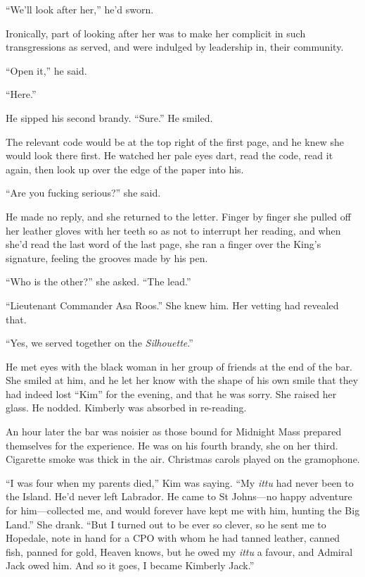 \documentclass[11pt,a5paper]{article}
\begin{document}
``We'll look after her,'' he'd sworn.

Ironically, part of looking after her was to make her complicit in such transgressions as served, and were indulged by leadership in, their community.

``Open it,'' he said.

``Here.''

He sipped his second brandy. ``Sure.'' He smiled.

The relevant code would be at the top right of the first page, and he knew she would look there first. He watched her pale eyes dart, read the code, read it again, then look up over the edge of the paper into his.

``Are you fucking serious?'' she said.

He made no reply, and she returned to the letter. Finger by finger she pulled off her leather gloves with her teeth so as not to interrupt her reading, and when she'd read the last word of the last page, she ran a finger over the King's signature, feeling the grooves made by his pen.

``Who is the other?'' she asked. ``The lead.''

``Lieutenant Commander Asa Roos.'' She knew him. Her vetting had revealed that.

``Yes, we served together on the \emph{Silhouette}.''

He met eyes with the black woman in her group of friends at the end of the bar. She smiled at him, and he let her know with the shape of his own smile that they had indeed lost ``Kim'' for the evening, and that he was sorry. She raised her glass. He nodded. Kimberly was absorbed in re-reading.

An hour later the bar was noisier as those bound for Midnight Mass prepared themselves for the experience. He was on his fourth brandy, she on her third. Cigarette smoke was thick in the air. Christmas carols played on the gramophone.

``I was four when my parents died,'' Kim was saying. ``My \emph{ittu} had never been to the Island. He'd never left Labrador. He came to St Johns---no happy adventure for him---collected me, and would forever have kept me with him, hunting the Big Land.'' She drank. ``But I turned out to be ever so clever, so he sent me to Hopedale, note in hand for a CPO with whom he had tanned leather, canned fish, panned for gold, Heaven knows, but he owed my \emph{ittu} a favour, and Admiral Jack owed him. And so it goes, I became Kimberly Jack.''
\end{document}
